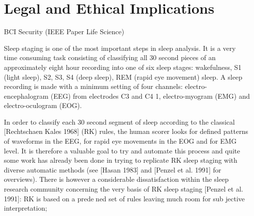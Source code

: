 \chapter{Legal and Ethical Implications}

BCI Security (IEEE Paper Life Science)



Sleep staging is one of the most important steps in sleep analysis. It is
a very time consuming task consisting of classifying all 30 second pieces
of an approximately eight hour recording into one of six sleep stages:
wakefulness, S1 (light sleep), S2, S3, S4 (deep sleep), REM (rapid eye
movement) sleep. A sleep recording is made with a minimum setting
of four channels: electro-encephalogram (EEG) from electrodes C3 and
C4 1, electro-myogram (EMG) and electro-oculogram (EOG). 

In order
to classify each 30 second segment of sleep according to the classical
[Rechtschaen  Kales 1968] (RK) rules, the human scorer looks for
defined patterns of waveforms in the EEG, for rapid eye movements in
the EOG and for EMG level. It is therefore a valuable goal to try and
automate this process and quite some work has already been done in
trying to replicate RK sleep staging with diverse automatic methods (see
[Hasan 1983] and [Penzel et al. 1991] for overviews). There is however a
considerable dissatisfaction within the sleep research community concerning
the very basis of RK sleep staging [Penzel et al. 1991]: RK is based on
a predened set of rules leaving much room for sub jective interpretation;